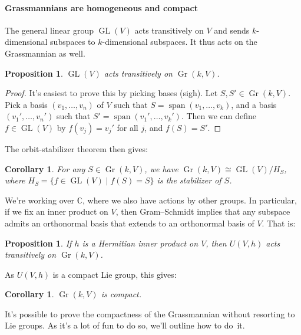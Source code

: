 \documentclass[11pt]{article}
\newtheorem{prop}[theo]{Proposition}
\newtheorem{coro}[theo]{Corollary}
\newtheorem*{proof}{Proof}
\newcommand{\kk}[1]{\mathbb{#1}}
\DeclareMathOperator{\Span}{span}
\DeclareMathOperator{\Gr}{Gr}
\DeclareMathOperator{\GL}{GL}
\begin{document}
\paragraph{Grassmannians are homogeneous and compact}

The general linear group $\GL(V)$ acts transitively on $V$ and sends $k$-dimensional subspaces to $k$-dimen\-sional subspaces. It thus acts on the Grassmannian as well.

\begin{prop}
$\GL(V)$ acts transitively on $\Gr(k,V)$.
\end{prop}

\begin{proof}
It's easiest to prove this by picking bases (sigh). Let $S,S' \in \Gr(k, V)$. Pick a basis $(v_1,\ldots,v_n)$ of $V$ such that $S = \Span(v_1,\ldots,v_k)$, and a basis $(v_1', \ldots, v_n')$ such that $S' = \Span(v_1', \ldots, v_k')$. Then we can define $f \in \GL(V)$ by $f(v_j) = v_j'$ for all $j$, and $f(S) = S'$.
\end{proof}

The orbit-stabilizer theorem then gives:

\begin{coro}
For any $S \in \Gr(k, V)$, we have $\Gr(k, V) \cong \GL(V) / H_S$, where $H_S = \{ f \in \GL(V) \mid f(S) = S \}$ is the stabilizer of $S$.
\end{coro}

We're working over $\kk C$, where we also have actions by other groups. In particular, if we fix an inner product on $V$, then Gram--Schmidt implies that any subspace admits an orthonormal basis that extends to an orthonormal basis of $V$. That is:

\begin{prop}
If $h$ is a Hermitian inner product on $V$, then $U(V,h)$ acts transitively on $\Gr(k, V)$.
\end{prop}

As $U(V,h)$ is a compact Lie group, this gives:

\begin{coro}
\label{coro:grassmannian-is-compact}
$\Gr(k, V)$ is compact.
\end{coro}

It's possible to prove the compactness of the Grassmannian without resorting to Lie groups. As it's a lot of fun to do so, we'll outline how to do~it.%
\end{document}

